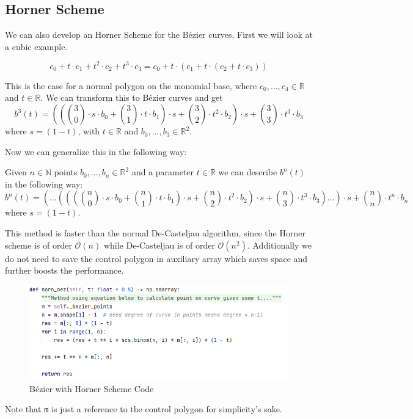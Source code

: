 \subsection{Horner Scheme}
We can also develop an Horner Scheme for the Bézier curves. First we will look at a cubic example.
\begin{example}
\[c_0 + t \cdot c_1 + t^2 \cdot c_2 + t^3 \cdot c_3 = c_0 + t \cdot (c_1 + t \cdot (c_2 + t \cdot c_3))\]

This is the case for a normal polygon on the monomial base, where $c_0, \dots, c_4 \in \mathbb{R}$ and $t \in \mathbb{R}$. We can transform this to Bézier curves and get
\[b^3(t) = \left(\left(\binom{3}{0} \cdot s \cdot b_0 + \binom{3}{1} \cdot t \cdot b_1\right) \cdot s + \binom{3}{2} \cdot t^2 \cdot b_2\right) \cdot s + \binom{3}{3} \cdot t^3 \cdot b_3\]
where $s = (1-t)$, with $t \in \mathbb{R}$ and $b_0, \dots, b_3 \in \mathbb{R}^2$.
\end{example}
Now we can generalize this in the following way:
\begin{definition}
Given $n \in \mathbb{N}$ points $b_0, \dots, b_n \in \mathbb{R}^2$ and a parameter $t \in \mathbb{R}$ we can describe $b^n(t)$ in the following way:
\[b^n(t) = \left(\dots\left(\left(\left(\binom{n}{0} \cdot s \cdot b_0 + \binom{n}{1} \cdot t \cdot b_1\right) \cdot s + \binom{n}{2} \cdot t^2 \cdot b_2\right) \cdot s + \binom{n}{3} \cdot t^3 \cdot b_3\right) \dots\right) \cdot s + \binom{n}{n} \cdot t^n \cdot b_n\]
where $s = (1-t)$. \\
\end{definition}
This method is faster than the normal De-Casteljau algorithm, since the Horner scheme is of order $\mathcal{O}(n)$ while De-Casteljau is of order $\mathcal{O}(n^2)$. Additionally we do not need to save the control polygon in auxiliary array which saves space and further boosts the performance.
\begin{figure}[H]
    \centering
    \includegraphics[width=\textwidth]{horner.png}
    \caption{Bézier with Horner Scheme Code}
    \label{fig:my_label}
\end{figure}
Note that \texttt{m} is just a reference to the control polygon for simplicity's sake.

